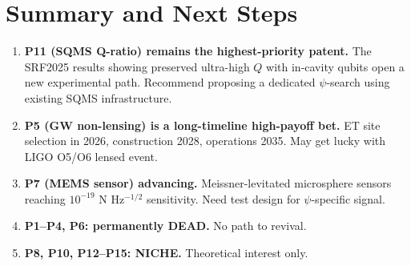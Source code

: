 \documentclass[11pt]{article}
\begin{document}
\section{Summary and Next Steps}

\begin{enumerate}
  \item \textbf{P11 (SQMS Q-ratio) remains the highest-priority patent.}
    The SRF2025 results showing preserved ultra-high $Q$ with in-cavity
    qubits open a new experimental path. Recommend proposing a dedicated
    $\psi$-search using existing SQMS infrastructure.
  \item \textbf{P5 (GW non-lensing) is a long-timeline high-payoff bet.}
    ET site selection in 2026, construction 2028, operations 2035. May
    get lucky with LIGO O5/O6 lensed event.
  \item \textbf{P7 (MEMS sensor) advancing.} Meissner-levitated microsphere
    sensors reaching $10^{-19}$ N Hz$^{-1/2}$ sensitivity. Need test
    design for $\psi$-specific signal.
  \item \textbf{P1--P4, P6: permanently DEAD.} No path to revival.
  \item \textbf{P8, P10, P12--P15: NICHE.} Theoretical interest only.
\end{enumerate}
\end{document}

